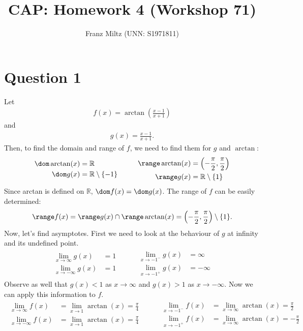 \documentclass{article}
\title{CAP: Homework 4 (Workshop 71)}
\author{Franz Miltz (UNN: S1971811)}
\begin{document}
\maketitle
\section*{Question 1}
Let
\begin{align*}
  f(x) = \arctan\left(\frac{x-1}{x+1}\right)
\end{align*}
and
\begin{align*}
  g(x) = \frac{x-1}{x+1}.
\end{align*}
Then, to find the domain and range of $f$, we need to find them for $g$ and $\arctan$:
\begin{align*}
  \begin{aligned}
    \dom \arctan(x) &= \mathbb{R}\\
    \dom g(x) &= \mathbb{R} \setminus \{-1\}
  \end{aligned}
  \hspace{1cm}
  \begin{aligned}
    \range \arctan(x) &= \left(-\frac{\pi}{2}, \frac{\pi}{2}\right)\\
    \range g(x) &= \mathbb{R}\setminus\{1\}
  \end{aligned}
\end{align*}
Since arctan is defined on $\mathbb{R}$, $\dom f(x) = \dom g(x)$. The range of $f$ can be easily determined: 
\begin{align*}
  \range f(x) = \range g(x) \cap \range \arctan(x) = \left(-\frac{\pi}{2}, \frac{\pi}{2}\right) \setminus \{1\}.
\end{align*}
Now, let's find asymptotes. First we need to look at the behaviour of $g$ at infinity and its undefined point.
\begin{align*}
  \begin{aligned}
    \lim_{x\to\infty}g(x) &= 1\\
    \lim_{x\to-\infty}g(x) &= 1
  \end{aligned}
  \hspace{1cm}
  \begin{aligned}
    \lim_{x\to-1^-}g(x)&=\infty\\
    \lim_{x\to-1^+}g(x)&=-\infty
  \end{aligned}
\end{align*}
Observe as well that $g(x)<1$ as $x\to\infty$ and $g(x)>1$ as $x\to-\infty$. Now we can apply this information to $f$.
\begin{align*}
  \begin{aligned}
    \lim_{x\to\infty}f(x) &= \lim_{x\to 1}\arctan(x)=\frac{\pi}{4}\\
    \lim_{x\to-\infty}f(x) &= \lim_{x\to 1}\arctan(x)=\frac{\pi}{4}
  \end{aligned}
  \hspace{1cm}
  \begin{aligned}
    \lim_{x\to-1^-}f(x) &= \lim_{x\to\infty}\arctan(x)= \frac{\pi}{2}\\
    \lim_{x\to-1^+}f(x) &= \lim_{x\to\infty}\arctan(x)=-\frac{\pi}{2}
  \end{aligned}
\end{align*}
\end{document}
